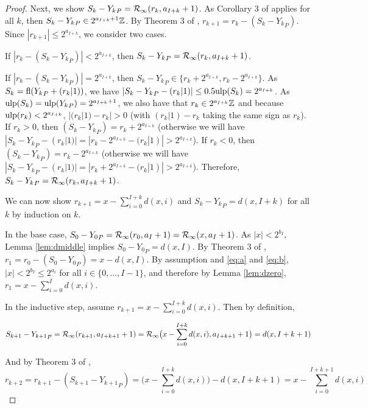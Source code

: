 \begin{proof}
        Next, we show $S_k - {Y_k}_P = \mathcal{R}_\text{$\infty$}(r_k, a_{I + k} + 1)$. As Corollary 3 of \cite{repsum} applies for all $k$, then $S_k - {Y_k}_P \in 2^{a_{I + k} + 1}\mathbb{Z}$. By Theorem 3 of \cite{repsum}, $r_{k + 1} = r_k - (S_k - {Y_k}_P)$. Since $|r_{k + 1}| \leq 2^{a_{I + k}}$, we consider two cases.

        If $|r_k - (S_k - {Y_k}_P)| < 2^{a_{I + k}}$, then $S_k - {Y_k}_P = \mathcal{R}_\text{$\infty$}(r_k, a_{I + k} + 1)$.

        If $|r_k - (S_k - {Y_k}_P)| = 2^{a_{I + k}}$, then $S_k - {Y_k}_P \in \{r_k + 2^{a_{I + k}},  r_k - 2^{a_{I + k}}\}$.
        As $S_k = \text{fl}({Y_k}_P + (r_k|1))$, we have $|S_k - {Y_k}_P - (r_k|1)| \leq 0.5\text{ulp}(S_k) = 2^{a_{I + k}}$.  As $\text{ulp}(S_k) = \text{ulp}({Y_k}_P) = 2^{a_{I + k} + 1}$, we also have that $r_k \in 2^{a_{I + k}}\mathbb{Z}$  and because $\text{ulp}(r_k) < 2^{a_{I + k}}$, $|(r_k|1) - r_k| > 0$ (with $(r_k|1) - r_k$ taking the same sign as $r_k$).
        If $r_k > 0$, then $(S_k - {Y_k}_P) = r_k + 2^{a_{I + k}}$ (otherwise we will have $|S_k - {Y_k}_P - (r_k|1)| = |r_k - 2^{a_{I + k}} - (r_k|1)| > 2^{a_{I + k}}$).
        If $r_k < 0$, then $(S_k - {Y_k}_P) = r_k - 2^{a_{I + k}}$ (otherwise we will have $|S_k - {Y_k}_P - (r_k|1)| = |r_k + 2^{a_{I + k}} - (r_k|1)| > 2^{a_{I + k}}$). Therefore, $S_k - {Y_k}_P = \mathcal{R}_\text{$\infty$}(r_k, a_{I + k} + 1)$.

        We can now show $r_{k + 1} = x - \sum\limits_{i = 0}^{I + k}d(x, i)$ and $S_k - {Y_k}_P = d(x, I + k)$ for all $k$ by induction on $k$.

        In the base case, $S_0 - {Y_0}_P = \mathcal{R}_\text{$\infty$}(r_0, a_I + 1) = \mathcal{R}_\text{$\infty$}(x, a_I + 1)$. As $|x| < 2^{b_I}$, Lemma \ref{lem:dmiddle} implies $S_0 - {Y_0}_P = d(x, I)$. By Theorem 3 of \cite{repsum}, $r_1 = r_0 - (S_0 - {Y_0}_P) = x - d(x,I)$. By assumption and  \eqref{eq:a} and \eqref{eq:b}, $|x| < 2^{b_I} \leq 2^{a_{i}}$ for all $i \in \{0, ..., I - 1\}$, and therefore by Lemma \ref{lem:dzero}, $r_1 = x - \sum\limits_{i = 0}^Id(x, i)$.

        In the inductive step, assume $r_{k + 1} = x - \sum\limits_{i = 0}^{I + k}d(x, i)$. Then by definition,

        \begin{equation*}
          S_{k + 1} - {Y_{k + 1}}_P = \mathcal{R}_\text{$\infty$}(r_{k + 1}, a_{I + k + 1} + 1) = \mathcal{R}_\text{$\infty$}\bigl(x - \sum\limits_{i = 0}^{I + k}d(x, i), a_{I + k + 1} + 1\bigr) = d(x, I + k + 1)
        \end{equation*}

        And by Theorem 3 of \cite{repsum},
        \begin{equation*}
          r_{k + 2} = r_{k + 1} - (S_{k + 1} - {Y_{k + 1}}_P) = \bigl(x - \sum\limits_{i = 0}^{I + k}d(x, i)\bigr) - d(x, I + k + 1) = x - \sum\limits_{i = 0}^{I + k + 1}d(x, i)
        \end{equation*}
      \end{proof}

